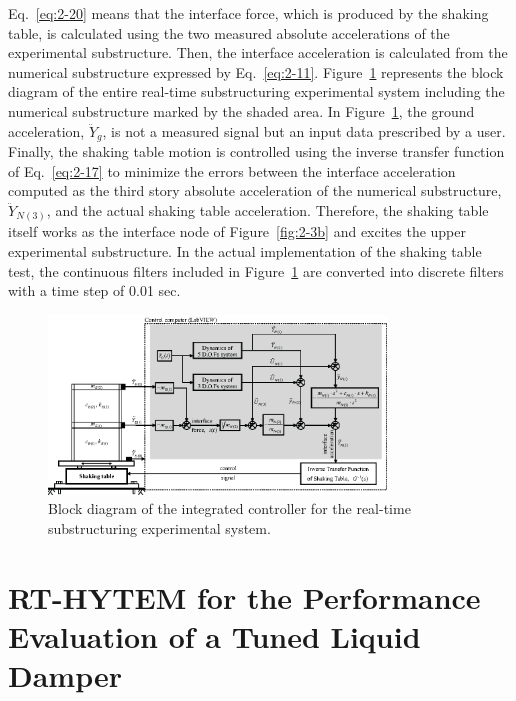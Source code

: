 Eq.~\eqref{eq:2-20} means that the interface force, which is produced by the shaking table, is calculated using the two measured absolute accelerations of the experimental substructure. Then, the interface acceleration is calculated from the numerical substructure expressed by Eq.~\eqref{eq:2-11}. Figure~\ref{fig:2-11} represents the block diagram of the entire real-time substructuring experimental system including the numerical substructure marked by the shaded area. In Figure~\ref{fig:2-11}, the ground acceleration, $\ddot{Y}_{g}$, is not a measured signal but an input data prescribed by a user. Finally, the shaking table motion is controlled using the inverse transfer function of Eq.~\eqref{eq:2-17} to minimize the errors between the interface acceleration computed as the third story absolute acceleration of the numerical substructure, $\ddot{Y}_{N(3)}$, and the actual shaking table acceleration. Therefore, the shaking table itself works as the interface node of Figure~\ref{fig:2-3b} and excites the upper experimental substructure. In the actual implementation of the shaking table test, the continuous filters included in Figure~\ref{fig:2-11} are converted into discrete filters with a time step of 0.01 sec.

\begin{figure}[ht]
\centering
\includegraphics[width=0.8\textwidth] {figure/2-11.eps}
\caption{Block diagram of the integrated controller for the real-time substructuring experimental system.}
\label{fig:2-11}
\end{figure}







\section{RT-HYTEM for the Performance Evaluation of a Tuned Liquid Damper}%
\label{chap:3}

